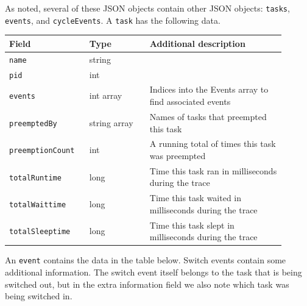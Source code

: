 \documentclass{hmcclinic}
\begin{document}
  As noted, several of these JSON objects contain other JSON objects: \texttt{tasks},
 \texttt{events}, and \texttt{cycleEvents}. A \texttt{task} has the following data.

  \begin{center}
    \begin{tabular}{p{0.25\linewidth}p{0.2\linewidth}p{0.45\linewidth}}
      \toprule
      Field           & Type         & Additional description \\
      \midrule
       \texttt{name}            & string       & \\
       \texttt{pid}             & int          & \\
       \texttt{events}          & int array    & Indices into the Events array to find associated events\\
       \texttt{preemptedBy}     & string array & Names of tasks that preempted this task \\
      \texttt{preemptionCount} & int          & A running total of times this task was preempted                    \\
       \texttt{totalRuntime}    & long         & Time this task ran in milliseconds during the trace        \\
       \texttt{totalWaittime}   & long         & Time this task waited in milliseconds during the trace     \\
       \texttt{totalSleeptime}  & long         & Time this task slept in milliseconds during the trace\\
      \bottomrule
    \end{tabular}
  \end{center}

  An \texttt{event} contains the data in the table below. Switch events contain some additional
  information. The switch event itself belongs to the task that is being
  switched out, but in the extra information field we also note which task
  was being switched in.
\end{document}

